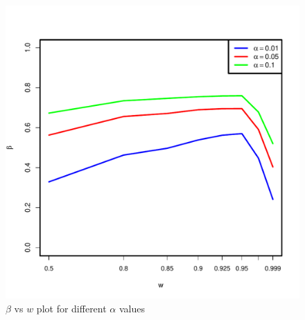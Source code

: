 \documentclass[12pt]{article} %
\begin{document}
\begin{figure}[h]
      \centering
         \includegraphics[scale=0.35]{OOSMVN-power-w-c0.pdf}
\caption{$\beta$ vs $w$ plot for different $\alpha$ values }
\label{fig:MVN-c0-power-w}
      

  \end{figure}
\end{document}
